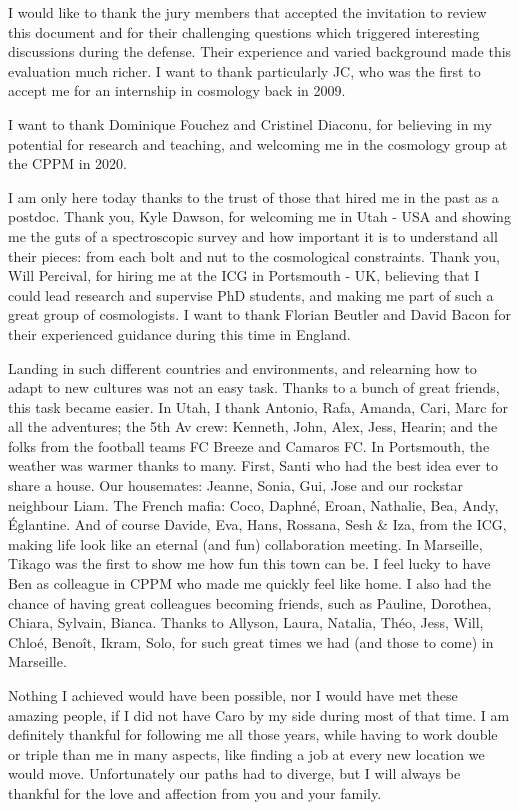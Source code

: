 

\indent I would like to thank the jury members that accepted the invitation 
to review this document and for their challenging questions which 
triggered interesting discussions during the defense. Their experience 
and varied background made this evaluation much richer. I want to thank 
particularly JC, who was the first to accept me for an internship in 
cosmology back in 2009.

I want to thank Dominique Fouchez and Cristinel Diaconu, 
for believing in my potential for research and teaching, and welcoming me 
in the cosmology group at the CPPM in 2020. 

I am only here today thanks to the trust of those that hired me in the past 
as a postdoc. 
Thank you, Kyle Dawson, for welcoming me in Utah - USA and showing me the guts of 
a spectroscopic survey and how important it is to understand all their pieces: 
from each bolt and nut to the cosmological constraints.  
Thank you, Will Percival, for hiring me at the ICG in Portsmouth - UK,
believing that I could lead research and supervise PhD students, and making me part of 
such a great group of cosmologists. I want to thank Florian Beutler and David Bacon 
for their experienced guidance during this time in England. 
 

Landing in such different countries and environments, and relearning how to adapt 
to new cultures was not an easy task. 
Thanks to a bunch of great friends, this task became easier. 
In Utah, I thank Antonio, Rafa, Amanda, Cari, Marc for all the adventures; 
the 5th Av crew: Kenneth, John, Alex, Jess, Hearin; 
and the folks from the football teams FC Breeze and Camaros FC. 
In Portsmouth, the weather was warmer thanks to many. First, Santi who had the best
idea ever to share a house. Our housemates: Jeanne, Sonia, Gui, Jose and our rockstar neighbour Liam. 
The French mafia: Coco, Daphné, Eroan, Nathalie, Bea, Andy, Églantine. 
And of course Davide, Eva, Hans, Rossana, Sesh \& Iza, from the ICG, making life look like 
an eternal (and fun) collaboration meeting.  
In Marseille, Tikago was the first to show me how fun this town can be. 
I feel lucky to have Ben as colleague in CPPM who made me  quickly feel like home.  
I also had the chance of having great colleagues becoming friends, such as 
Pauline, Dorothea, Chiara, Sylvain, Bianca. 
Thanks to Allyson, Laura, Natalia, Théo, Jess, Will, Chloé, Benoît, Ikram, Solo, 
for such great times we had (and those to come) in Marseille. 

Nothing I achieved would have been possible, nor I would have met these amazing people, 
if I did not have Caro by my side during most of that time. 
I am definitely thankful for following me all those years, while having to work double 
or triple than me in many aspects, like finding a job at every new location we would move. 
Unfortunately our paths had to diverge, but I will always be thankful for the love and affection 
from you and your family.  

